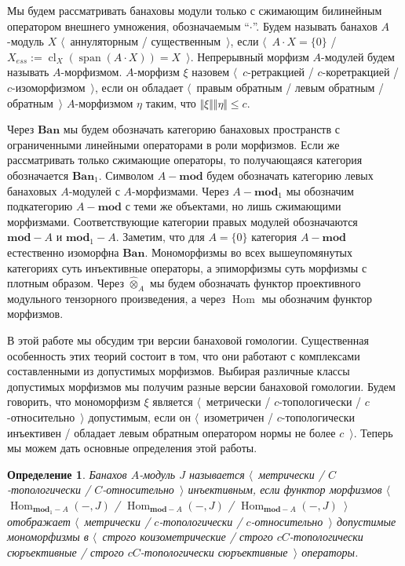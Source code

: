 \documentclass[12pt]{article}
\newtheorem{definition}[theorem]{Определение}
\newcommand{\projtens}{\mathbin{\widehat{\otimes}}}
\begin{document}
Мы будем рассматривать банаховы модули только с сжимающим билинейным оператором
внешнего умножения, обозначаемым ``$\cdot$''. Будем называть банахов $A$-модуль
$X$ $\langle$~аннуляторным / существенным~$\rangle$, если $\langle$~$A\cdot X=
\{0 \}$ / $X_{ess}:=\operatorname{cl}_X(\operatorname{span}(A\cdot
X))=X$~$\rangle$. Непрерывный морфизм $A$-модулей будем называть $A$-морфизмом.
$A$-морфизм $\xi$ назовем $\langle$~$c$-ретракцией / $c$-коретракцией /
$c$-изоморфизмом~$\rangle$, если он обладает $\langle$~правым обратным / левым
обратным / обратным~$\rangle$ $A$-морфизмом $\eta$ таким, что
$\Vert\xi\Vert\Vert\eta\Vert\leq c$. 

Через $\mathbf{Ban}$ мы будем обозначать категорию банаховых пространств с
ограниченными линейными операторами в роли морфизмов. Если же рассматривать
только сжимающие операторы, то получающаяся категория обозначается
$\mathbf{Ban}_1$. Символом $A-\mathbf{mod}$ будем обозначать категорию левых
банаховых $A$-модулей с $A$-морфизмами. Через $A-\mathbf{mod}_1$ мы обозначим
подкатегорию $A-\mathbf{mod}$ с теми же объектами, но лишь сжимающими
морфизмами. Соответствующие категории правых модулей обозначаются
$\mathbf{mod}-A$ и $\mathbf{mod}_1-A$. Заметим, что для $A= \{0 \}$ категория
$A-\mathbf{mod}$ естественно изоморфна $\mathbf{Ban}$. Мономорфизмы во всех
вышеупомянутых категориях суть инъективные операторы, а эпиморфизмы суть
морфизмы с плотным образом. Через $\projtens_A$ мы будем обозначать функтор
проективного модульного тензорного произведения, а через $\operatorname{Hom}$ мы
обозначим функтор морфизмов.

В этой работе мы обсудим три версии банаховой гомологии. Существенная
особенность этих теорий состоит в том, что они работают с комплексами
составленными из допустимых морфизмов. Выбирая различные классы допустимых
морфизмов мы получим разные версии банаховой гомологии. Будем говорить, что
мономорфизм $\xi$ является $\langle$~метрически / $c$-топологически /
$c$-относительно~$\rangle$ допустимым, если он $\langle$~изометричен /
$c$-топологически инъективен / обладает левым обратным оператором нормы не более
$c$~$\rangle$. Теперь мы можем дать основные определения этой работы. 

\begin{definition} Банахов $A$-модуль $J$ называется \emph{$\langle$~метрически
/ $C$-топологически / $C$-относительно~$\rangle$ инъективным}, если функтор
морфизмов $\langle$~$\operatorname{Hom}_{\mathbf{mod}_1-A}(-,J)$ /
$\operatorname{Hom}_{\mathbf{mod}-A}(-,J)$ /
$\operatorname{Hom}_{\mathbf{mod}-A}(-,J)$~$\rangle$ отображает
$\langle$~метрически / $c$-топологически / $c$-относительно~$\rangle$ допустимые
мономорфизмы в $\langle$~строго коизометрические / строго $cC$-топологически
сюръективные / строго $cC$-топологически сюръективные~$\rangle$ операторы.
\end{definition}
\end{document}
